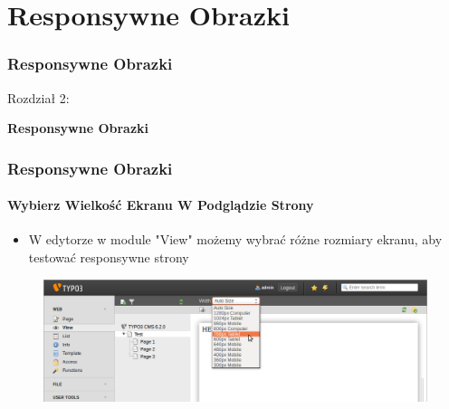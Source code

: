 %
\section{Responsywne Obrazki}
\begin{frame}[fragile]
	\frametitle{Responsywne Obrazki}

	\begin{center}\huge{Rozdział 2:}\end{center}
	\begin{center}\huge{\color{typo3darkgrey}\textbf{Responsywne Obrazki}}\end{center}

\end{frame}


\begin{frame}[fragile]
	\frametitle{Responsywne Obrazki}
	\framesubtitle{Wybierz Wielkość Ekranu W Podglądzie Strony}

	\begin{itemize}
		\item W edytorze w module "View" możemy wybrać różne rozmiary ekranu, aby testować responsywne strony 
	\end{itemize}

	\begin{figure}
		\includegraphics[width=0.95\linewidth]{Images/ResponsiveImages/ScreenSizeInPagePreview.png}
	\end{figure}

\end{frame}

